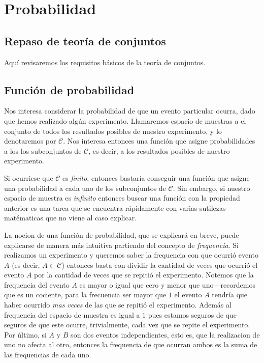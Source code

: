 \chapter{Probabilidad}%
\label{cha:Probabilidad}

\section{Repaso de teoría de conjuntos}%
\label{sec:teoria-conj}

Aquí revisaremos los requisitos básicos de la teoría de conjuntos.

\section{Función de probabilidad}%
\label{sec:funcion_probabilidad}

Nos interesa considerar la probabilidad de que un evento particular ocurra, dado que hemos realizado algún experimento.
Llamaremos espacio de muestras a el conjunto de todos los resultados posibles de nuestro experimento, y lo denotaremos por $\mathcal{C}$.
Nos interesa entonces una función que asigne probabilidades a los los subconjuntos de $\mathcal{C}$, es decir, a los resultados posibles de nuestro experimento.

Si ocurriese que $\mathcal{C}$ es \emph{finito}, entonces bastaría conseguir una función que asigne una probabilidad a cada uno de los subconjuntos de $\mathcal{C}$.
Sin embargo, si nuestro espacio de muestra es \emph{infinito} entonces buscar una función con la propiedad anterior es una tarea que se encuentra rápidamente con varias sutilezas matématicas que no viene al caso explicar.

La nocion de una función de probabilidad, que se explicará en breve, puede explicarse de manera más intuitiva partiendo del concepto de \emph{frequencia}.
Si realizamos un experimento y queremos saber la frequencia con que ocurrió evento $A$ (es decir, $A\subset\mathcal{C}$) entonces basta con dividir la cantidad de veces que ocurrió el evento $A$ por la cantidad de veces que se repitió el experimento.
Notemos que la frequencia del evento $A$ es mayor o igual que cero y menor que uno---recordemos que es un cociente, para la frecuencia ser mayor que $1$ el evento $A$ tendría que haber ocurrido \emph{mas veces} de las que se repitió el experimento. 
Además al frequencia del espacio de muestra es igual a $1$ pues estamos seguros de que seguros de que este ocurre, trivialmente, cada vez que se repite el experimento. 
Por último, si $A$ y $B$ son dos eventos independientes, esto es, que la realizacion de uno no afecta al otro, entonces la frequencia de que ocurran ambos es la suma de las frequencias de cada uno.

